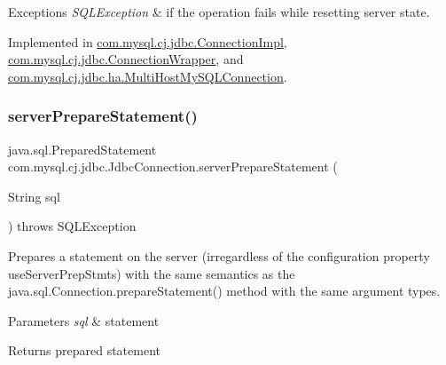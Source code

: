 \begin{DoxyExceptions}{Exceptions}
{\em S\+Q\+L\+Exception} & if the operation fails while resetting server state. \\
\hline
\end{DoxyExceptions}


Implemented in \mbox{\hyperlink{classcom_1_1mysql_1_1cj_1_1jdbc_1_1_connection_impl_adccdf6ec2e52545cff1a649ccecbdd62}{com.\+mysql.\+cj.\+jdbc.\+Connection\+Impl}}, \mbox{\hyperlink{classcom_1_1mysql_1_1cj_1_1jdbc_1_1_connection_wrapper_a420204849914ad076e502ba7753ba6b5}{com.\+mysql.\+cj.\+jdbc.\+Connection\+Wrapper}}, and \mbox{\hyperlink{classcom_1_1mysql_1_1cj_1_1jdbc_1_1ha_1_1_multi_host_my_s_q_l_connection_aa4aba4efd08774027532a7a9092bca57}{com.\+mysql.\+cj.\+jdbc.\+ha.\+Multi\+Host\+My\+S\+Q\+L\+Connection}}.

\mbox{\label{interfacecom_1_1mysql_1_1cj_1_1jdbc_1_1_jdbc_connection_add415475386bd7577301fddbdd5518b8}} 
\subsubsection{\texorpdfstring{server\+Prepare\+Statement()}{serverPrepareStatement()}\hspace{0.1cm}{\footnotesize\ttfamily [1/6]}}
{\footnotesize\ttfamily java.\+sql.\+Prepared\+Statement com.\+mysql.\+cj.\+jdbc.\+Jdbc\+Connection.\+server\+Prepare\+Statement (\begin{DoxyParamCaption}\item[{String}]{sql }\end{DoxyParamCaption}) throws S\+Q\+L\+Exception}

Prepares a statement on the server (irregardless of the configuration property \textquotesingle{}use\+Server\+Prep\+Stmts\textquotesingle{}) with the same semantics as the java.\+sql.\+Connection.\+prepare\+Statement() method with the same argument types.


\begin{DoxyParams}{Parameters}
{\em sql} & statement \\
\hline
\end{DoxyParams}
\begin{DoxyReturn}{Returns}
prepared statement 
\end{DoxyReturn}

